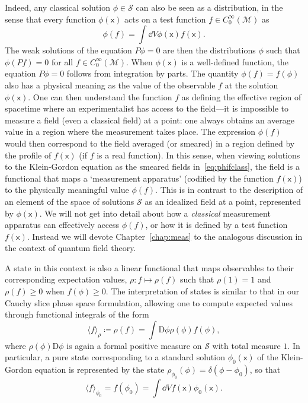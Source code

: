 \documentclass[letterpaper,12pt,titlepage,oneside,final]{book}
\newcommand{\M}{\mathcal{M}}
\renewcommand{\S}{\mathcal{S}}
\newcommand{\mf}{\mathsf}%
\begin{document}
Indeed, any classical solution $\phi\in\mathcal{S}$ can also be seen as a distribution, in the sense that every function $\phi(\mf x)$ acts on a test function $f\in C_0^\infty(\M)$ as
\begin{equation}\label{eq:phifclass}
    \phi(f) = \int \dd V \phi(\mf x) f(\mf x).
\end{equation}
The weak solutions of the equation $P\phi = 0$ are then the distributions $\phi$ such that $\phi(Pf) = 0$ for all $f\in C_0^\infty(\M)$. When $\phi(\mf x)$ is a well-defined function, the equation $P\phi = 0$ follows from integration by parts. The quantity $\phi(f) = f(\phi)$ also has a physical meaning as the value of the observable $f$ at the solution $\phi(\mf x)$. One can then understand the function $f$ as defining the effective region of spacetime where an experimentalist has access to the field---it is impossible to measure a field (even a classical field) at a point: one always obtains an average value in a region where the measurement takes place. The expression $\phi(f)$ would then correspond to the field averaged (or smeared) in a region defined by the profile of $f(\mf x)$ (if $f$ is a real function). In this sense, when viewing solutions to the Klein-Gordon equation as the smeared fields in~\eqref{eq:phifclass}, the field is a functional that maps a `measurement apparatus' (codified by the function $f(\mf x)$) to the physically meaningful value $\phi(f)$. This is in contrast to the description of an element of the space of solutions $\S$ as an idealized field at a point, represented by $\phi(\mf x)$. We will not get into detail about how a \textit{classical} measurement apparatus can effectively access $\phi(f)$, or how it is defined by a test function $f(\mf x)$. Instead we will devote Chapter~\ref{chap:meas} to the analogous discussion in the context of quantum field theory.

A state in this context is also a linear functional that maps observables to their corresponding expectation values, $\rho:f\mapsto \rho(f)$ such that $\rho(1) = 1$ and $\rho(f)\geq 0$ when $f(\phi) \geq 0$. The interpretation of states is similar to that in our Cauchy slice phase space formulation, allowing one to compute expected values through functional integrals of the form
\begin{equation}
    \langle f\rangle_\rho \coloneqq \rho(f) = \int \text{D}\phi \rho(\phi) f(\phi),
\end{equation}
where $\rho(\phi)\text{D}\phi$ is again a formal positive measure on $\mathcal{S}$ with total measure $1$. In particular, a pure state corresponding to a standard solution $\phi_0(\mf x)$ of the Klein-Gordon equation is represented by the state $\rho_{\phi_0}(\phi) = \delta(\phi - \phi_0)$, so that 
\begin{equation}
    \langle f\rangle_{\phi_0} = f(\phi_0) = \int \dd V f(\mf x) \phi_0(\mf x).
\end{equation}
\end{document}
